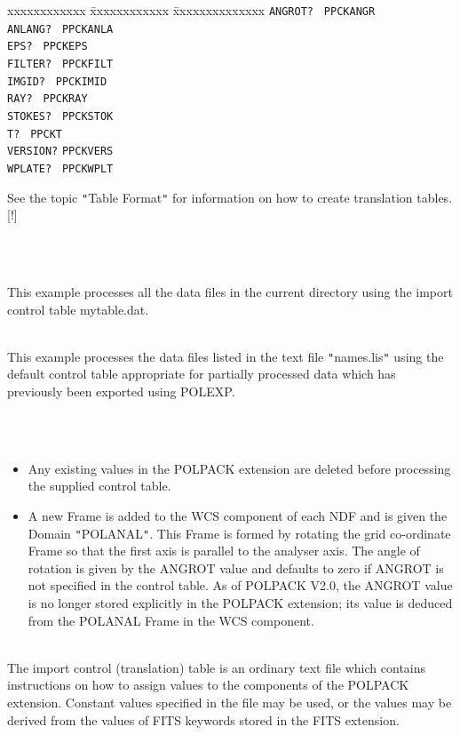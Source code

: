 \documentclass[twoside,11pt]{article}
\newcommand{\htmlref}[2]{#1}
\renewcommand{\_}{\texttt{\symbol{95}}}
\newlength{\sstexampleslength}
\newcommand{\sstexamples}[1]{
   \item[Examples:] \mbox{} \\
   \vspace{-3.5ex}
   \begin{description}
      #1
   \end{description}
}
\newcommand{\sstexamplesubsection}[2]{\sloppy
\item[\parbox{\sstexampleslength}{\ssttt #1}] \mbox{} \vspace{1.0ex}
\\ #2 }
\newcommand{\sstnotes}[1]{\item[Notes:] \mbox{} \\[1.3ex] #1}
\newcommand{\sstdiytopic}[2]{\item[{\hspace{-0.35em}#1\hspace{-0.35em}:}]
\mbox{} \\[1.3ex] #2}
\newcommand{\sstitemlist}[1]{
  \mbox{} \\
  \vspace{-3.5ex}
  \begin{itemize}
     #1
  \end{itemize}
}
\newcommand{\sstitem}{\item}
\newcommand{\sstexamples}[1]{
      \item[Examples:] \\
      \begin{description}
         #1
      \end{description}
      \\
   }
\newcommand{\sstexamplesubsection}[2]{\item[{\ssttt #1}] #2}
\newcommand{\sstnotes}[1]{\item[Notes:] #1 }
\newcommand{\sstdiytopic}[2]{\item[{#1}] #2 }
\newcommand{\sstitemlist}[1]{
      \begin{itemize}
         #1
      \end{itemize}
      \\
   }
\newcommand{\sstitem}{\item}
\begin{document}
{{{\begin{tabbing}
 xxxxxxxxxxxx \= xxxxxxxxxxxx          \= xxxxxxxxxxxxxx \kill
              \>  \texttt{ANGROT? }    \> \texttt{PPCKANGR}  \\
              \>  \texttt{ANLANG? }    \> \texttt{PPCKANLA} \\
              \>  \texttt{EPS?    }    \> \texttt{PPCKEPS} \\
              \>  \texttt{FILTER? }    \> \texttt{PPCKFILT} \\
              \>  \texttt{IMGID?  }    \> \texttt{PPCKIMID} \\
              \>  \texttt{RAY?    }    \> \texttt{PPCKRAY} \\
              \>  \texttt{STOKES? }    \> \texttt{PPCKSTOK} \\
              \>  \texttt{T?      }    \> \texttt{PPCKT} \\
              \>  \texttt{VERSION?}    \> \texttt{PPCKVERS} \\
              \>  \texttt{WPLATE? }    \> \texttt{PPCKWPLT}
\end{tabbing}

         See the topic {\tt "}Table Format{\tt "} for information on how to create
         translation tables. [!]
      }
   }
   \sstexamples{
      \sstexamplesubsection{
         polimp in={\tt '}$*${\tt '} table=mytable.dat
      }{
         This example processes all the data files in the current directory
         using the import control table mytable.dat.
      }
      \sstexamplesubsection{
         polimp in=$\wedge$names.lis
      }{
         This example processes the data files listed in the text file
         {\tt "}names.lis{\tt "} using the default control table appropriate for
         partially processed data which has previously been exported using
         \htmlref{POLEXP}{POLEXP}.
      }
   }
   \sstnotes{
      \sstitemlist{

         \sstitem
         Any existing values in the POLPACK extension are deleted before
         processing the supplied control table.

         \sstitem
         A new Frame is added to the WCS component of each NDF and is given the
         Domain {\tt "}POLANAL{\tt "}. This Frame is formed by rotating the grid co-ordinate
         Frame so that the first axis is parallel to the analyser axis. The
         angle of rotation is given by the ANGROT value and defaults to zero
         if ANGROT is not specified in the control table. As of POLPACK V2.0,
         the ANGROT value is no longer stored explicitly in the POLPACK
         extension; its value is deduced from the POLANAL Frame in the WCS
         component.
      }
   }
   \sstdiytopic{
      Table Format
   }{
      The import control (translation) table is an ordinary text file
      which contains instructions on how to assign values to the components
      of the POLPACK extension. Constant values specified in
      the file may be used, or the values may be derived from the values
      of FITS keywords stored in the FITS extension.

}}
\end{document}
